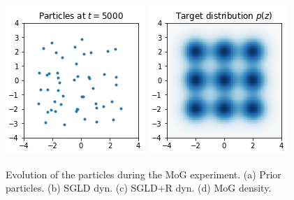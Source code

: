 \begin{figure}[ht]
\begin{center}
\endminipage\hfill
{}
  \includegraphics[width=\linewidth]{img/psvgd.png}
\endminipage\hfill
{}
  \includegraphics[width=\linewidth]{img/target.png}\label{fig:3x3gauss}
\endminipage
\end{center}
\caption{Evolution of the particles during the MoG experiment. (a) Prior particles. (b) SGLD dyn. (c) SGLD+R dyn. (d) MoG density.}\label{fig:mog}
\end{figure}


